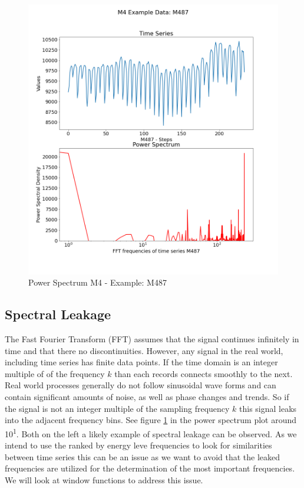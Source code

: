 \documentclass[phd,black, hidelinks]{PrincetonThesis}
\begin{document}
\begin{figure}[htbp]
\centering
\includegraphics[width=.9\linewidth]{./img/fft_example.png}
\caption{\label{fig:orgd27be2d}Power Spectrum M4 - Example: M487}
\end{figure}
\subsection{Spectral Leakage}
\label{sec:orge38faf1}
\label{orgeb5c515}
The Fast Fourier Transform (FFT) assumes that the signal continues infinitely in time and that there no discontinuities. However, any signal in the real world, including time series has finite data points. If the time domain is an integer multiple of of the frequency \(k\) than each records connects smoothly to the next. Real world processes generally do not follow sinusoidal wave forms and can contain significant amounts of noise, as well as phase changes and trends. So if the signal is not an integer multiple of the sampling frequency \(k\) this signal leaks into the adjacent frequency bins. See figure \ref{fig:orgd27be2d} in the power spectrum plot around 10\textsuperscript{1}. Both on the left a likely example of spectral leakage can be observed. As we intend to use the ranked by energy leve frequencies to look for similarities between time series this can be an issue as we want to avoid that the leaked frequencies are utilized for the determination of the most important frequencies. We will look at window functions to address this issue.
\end{document}

